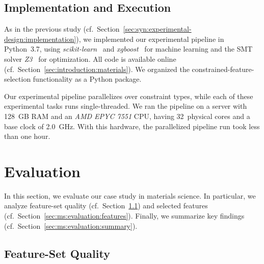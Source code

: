 \subsection{Implementation and Execution}
\label{sec:ms:experimental-design:implementation}

As in the previous study (cf.~Section~\ref{sec:syn:experimental-design:implementation}), we implemented our experimental pipeline in Python~3.7, using \emph{scikit-learn}~\cite{pedregosa2011scikit-learn} and \emph{xgboost}~\cite{chen2016xgboost} for machine learning and the SMT solver \emph{Z3}~\cite{bjorner2015nuz, deMoura2008z3} for optimization.
All code is available online (cf.~Section~\ref{sec:introduction:materials}).
We organized the constrained-feature-selection functionality as a Python package.

Our experimental pipeline parallelizes over constraint types, while each of these experimental tasks runs single-threaded.
We ran the pipeline on a server with 128~GB RAM and an \emph{AMD EPYC 7551} CPU, having 32~physical cores and a base clock of 2.0~GHz.
With this hardware, the parallelized pipeline run took less than one hour.

\section{Evaluation}
\label{sec:ms:evaluation}

In this section, we evaluate our case study in materials science.
In particular, we analyze feature-set quality (cf.~Section~\ref{sec:ms:evaluation:quality}) and selected features (cf.~Section~\ref{sec:ms:evaluation:features}).
Finally, we summarize key findings (cf.~Section~\ref{sec:ms:evaluation:summary}).

\subsection{Feature-Set Quality}
\label{sec:ms:evaluation:quality}


